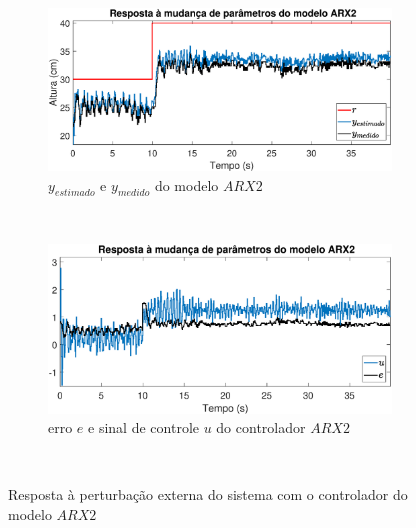 \begin{figure}[H]
	\centering
	\begin{subfigure}[b]{1\textwidth}
		\includegraphics[width=1\linewidth]{mprarx2y}
		\caption[$y_{estimado}$ e $y_{medido}$ do modelo $ARX2$]{$y_{estimado}$ e $y_{medido}$ do modelo $ARX2$}
		\label{fig:mprarx2y}
	\end{subfigure}
	~ %
	\begin{subfigure}[b]{1\textwidth}
		\includegraphics[width=1\linewidth]{mprarx2e}
		\caption[erro $e$ e sinal de controle $u$ do controlador $ARX2$]{erro $e$ e sinal de controle $u$ do controlador $ARX2$}
		\label{fig:mprarx2e}
	\end{subfigure}
	~ %
	
	\caption{Resposta à perturbação externa do sistema com o controlador do modelo $ARX2$}\label{fig:mprarx2}
\end{figure}



